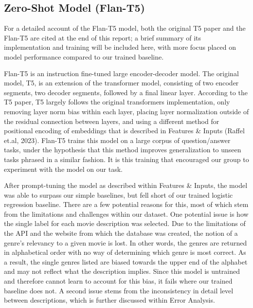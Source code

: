 \documentclass[../main.tex]{subfiles}
\begin{document}
\subsection{Zero-Shot Model (Flan-T5)}
For a detailed account of the Flan-T5 model, both the original T5 paper and the Flan-T5 are cited at the end of this report; a brief summary of its implementation and training will be included here, with more focus placed on model performance compared to our trained baseline. 

Flan-T5 is an instruction fine-tuned large encoder-decoder model. 
The original model, T5, is an extension of the transformer model, consisting of two encoder segments, two decoder segments, followed by a final linear layer. 
According to the T5 paper, T5 largely follows the original transformers implementation, only removing layer norm bias within each layer, placing layer normalization outside of the residual connection between layers, and using a different method for positional encoding of embeddings that is described in Features \& Inputs (Raffel et.al, 2023). 
Flan-T5 trains this model on a large corpus of question/answer tasks, under the hypothesis that this method improves generalization to unseen tasks phrased in a similar fashion. 
It is this training that encouraged our group to experiment with the model on our task.
	
After prompt-tuning the model as described within Features \& Inputs, the model was able to surpass our simple baselines, but fell short of our trained logistic regression baseline. 
There are a few potential reasons for this, most of which stem from the limitations and challenges within our dataset. 
One potential issue is how the single label for each movie description was selected. 
Due to the limitations of the API and the website from which the database was created, the notion of a genre’s relevancy to a given movie is lost. 
In other words, the genres are returned in alphabetical order with no way of determining which genre is most correct. 
As a result, the single genres listed are biased towards the upper end of the alphabet and may not reflect what the description implies. 
Since this model is untrained and therefore cannot learn to account for this bias, it fails where our trained baseline does not. 
A second issue stems from the inconsistency in detail level between descriptions, which is further discussed within Error Analysis.
\end{document}
